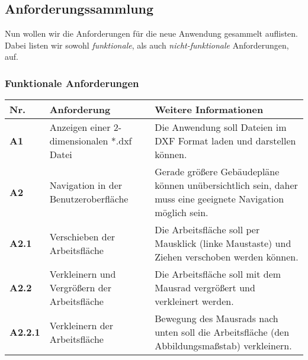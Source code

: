 \subsection{Anforderungssammlung}
\label{subsec:requirements}

Nun wollen wir die Anforderungen für die neue Anwendung gesammelt auflisten.
Dabei listen wir sowohl \textit{funktionale}, als auch \textit{nicht-funktionale} Anforderungen, auf.

\vspace{8pt}

\subsubsection{Funktionale Anforderungen}
\label{subsubsec:functional-requirements}

\begin{center}
    \small
    \begin{supertabular}{ p{1cm}|p{3cm}|p{4cm} }
        Nr.             & Anforderung                                   & Weitere Informationen                                                                                                                                                                            \\
        \hline
        \textbf{A1}     & Anzeigen einer 2-dimensionalen *.dxf Datei    & Die Anwendung soll Dateien im DXF Format laden und darstellen können.                                                                                                                            \\
        \textbf{A2}     & Navigation in der Benutzeroberfläche          & Gerade größere Gebäudepläne können unübersichtlich sein, daher muss eine geeignete Navigation möglich sein.                                                                                      \\
        \textbf{A2.1}   & Verschieben der Arbeitsfläche                 & Die Arbeitsfläche soll per Mausklick (linke Maustaste) und Ziehen verschoben werden können.                                                                                                      \\
        \textbf{A2.2}   & Verkleinern und Vergrößern der Arbeitsfläche  & Die Arbeitsfläche soll mit dem Mausrad vergrößert und verkleinert werden.                                                                                                                        \\
        \textbf{A2.2.1} & Verkleinern der Arbeitsfläche                 & Bewegung des Mausrads nach unten soll die Arbeitsfläche (den Abbildungsmaßstab) verkleinern.                                                                                                     \\

\end{supertabular}
\end{center}
